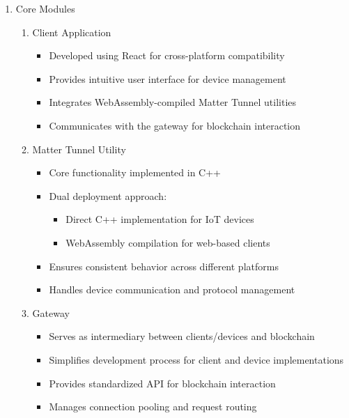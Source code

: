 \documentclass[conference]{IEEEtran}
\begin{document}
\begin{enumerate}[itemsep=2ex, parsep=1ex]
	\item{Core Modules}
		
	\begin{enumerate}
		\item Client Application
		      \begin{itemize}[itemsep=0.5pt, parsep=0.5pt]
		      	\item Developed using React for cross-platform compatibility
		      	\item Provides intuitive user interface for device management
		      	\item Integrates WebAssembly-compiled Matter Tunnel utilities
		      	\item Communicates with the gateway for blockchain interaction
		      \end{itemize}
		      		      
		\item Matter Tunnel Utility
		      \begin{itemize}[itemsep=0.5pt, parsep=0.5pt]
		      	\item Core functionality implemented in C++
		      	\item Dual deployment approach:
		      	      \begin{itemize}[itemsep=0.5pt, parsep=0.5pt]
		      	      	\item Direct C++ implementation for IoT devices
		      	      	\item WebAssembly compilation for web-based clients
		      	      \end{itemize}
		      	\item Ensures consistent behavior across different platforms
		      	\item Handles device communication and protocol management
		      \end{itemize}
		      		      
		\item Gateway
		      \begin{itemize}[itemsep=0.5pt, parsep=0.5pt]
		      	\item Serves as intermediary between clients/devices and blockchain
		      	\item Simplifies development process for client and device implementations
		      	\item Provides standardized API for blockchain interaction
		      	\item Manages connection pooling and request routing
		      \end{itemize}
		      		      

\end{enumerate}
\end{enumerate}
\end{document}
